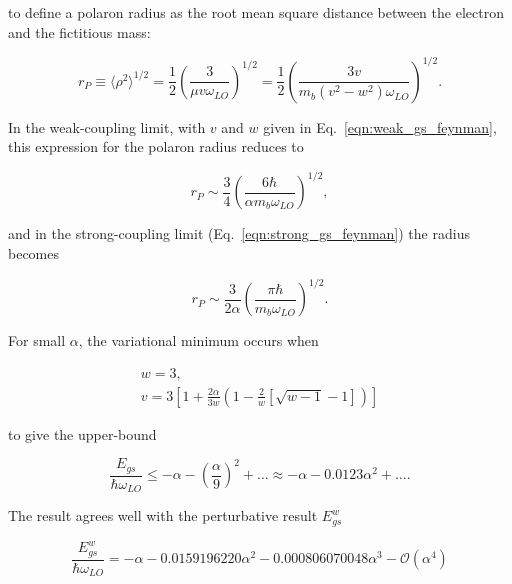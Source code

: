 to define a polaron radius as the root mean square distance between the electron and the fictitious mass:

\begin{equation}
    \label{eqn:pol_size_schultz}
    r_P \equiv \langle \rho^2 \rangle^{1/2} = \frac{1}{2} \left(\frac{3}{\mu v \omega_{LO}}\right)^{1/2} = \frac{1}{2} \left( \frac{3 v}{m_b (v^2 - w^2) \omega_{LO}} \right)^{1/2}.
\end{equation}

In the weak-coupling limit, with $v$ and $w$ given in Eq.~\ref{eqn:weak_gs_feynman}, this expression for the polaron radius reduces to

\begin{equation}
    \label{eqn:weak_size_schultz}
    r_P \sim \frac{3}{4} \left(\frac{6\hbar}{\alpha m_b \omega_{LO}}\right)^{1/2},
\end{equation}

and in the strong-coupling limit (Eq.~\ref{eqn:strong_gs_feynman}) the radius becomes 

\begin{equation}
    \label{eqn:strong_size_schultz}
    r_P \sim \frac{3 }{2\alpha} \left(\frac{\pi \hbar}{m_b \omega_{LO}}\right)^{1/2}.
\end{equation}

For small $\alpha$, the variational minimum occurs when

\begin{equation}
\begin{gathered}
    w = 3, \\ 
    v = 3 \left[ 1 + \frac{2\alpha}{3w} \left(1 -\frac{2}{w} \left[ \sqrt{w-1}-1 \right] \right) \right]
\end{gathered}
\end{equation}

to give the upper-bound

\begin{equation}
    \frac{E_{gs}}{\hbar\omega_{LO}} \leq -\alpha - \left(\frac{\alpha}{9}\right)^2 + \dots \approx -\alpha - 0.0123 \alpha^2 + \dots.
\end{equation}

The result agrees well with the perturbative result $E^w_{gs}$

\begin{equation}
    \frac{E^w_{gs}}{\hbar\omega_{LO}} = -\alpha - 0.0159196220 \alpha^2 - 0.000806070048 \alpha^3 - \mathcal{O}\left(\alpha^4\right) 
\end{equation}

